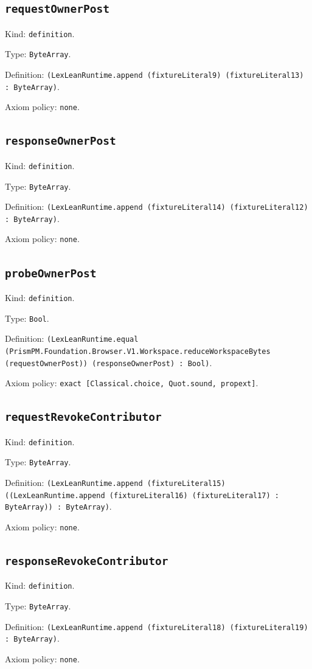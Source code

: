 \documentclass[11pt]{article}
\begin{document}
\subsection*{\texttt{requestOwnerPost}}
\noindent Kind: \texttt{definition}.\par
\noindent Type: \texttt{ByteArray}.\par
\noindent Definition: \texttt{(LexLeanRuntime.append (fixtureLiteral9) (fixtureLiteral13) : ByteArray)}.\par
\noindent Axiom policy: \texttt{none}.\par
\subsection*{\texttt{responseOwnerPost}}
\noindent Kind: \texttt{definition}.\par
\noindent Type: \texttt{ByteArray}.\par
\noindent Definition: \texttt{(LexLeanRuntime.append (fixtureLiteral14) (fixtureLiteral12) : ByteArray)}.\par
\noindent Axiom policy: \texttt{none}.\par
\subsection*{\texttt{probeOwnerPost}}
\noindent Kind: \texttt{definition}.\par
\noindent Type: \texttt{Bool}.\par
\noindent Definition: \texttt{(LexLeanRuntime.equal (PrismPM.Foundation.Browser.V1.Workspace.reduceWorkspaceBytes (requestOwnerPost)) (responseOwnerPost) : Bool)}.\par
\noindent Axiom policy: \texttt{exact [Classical.choice, Quot.sound, propext]}.\par
\subsection*{\texttt{requestRevokeContributor}}
\noindent Kind: \texttt{definition}.\par
\noindent Type: \texttt{ByteArray}.\par
\noindent Definition: \texttt{(LexLeanRuntime.append (fixtureLiteral15) ((LexLeanRuntime.append (fixtureLiteral16) (fixtureLiteral17) : ByteArray)) : ByteArray)}.\par
\noindent Axiom policy: \texttt{none}.\par
\subsection*{\texttt{responseRevokeContributor}}
\noindent Kind: \texttt{definition}.\par
\noindent Type: \texttt{ByteArray}.\par
\noindent Definition: \texttt{(LexLeanRuntime.append (fixtureLiteral18) (fixtureLiteral19) : ByteArray)}.\par
\noindent Axiom policy: \texttt{none}.\par
\end{document}
